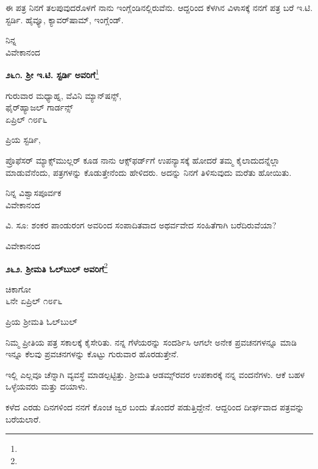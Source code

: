 ಈ ಪತ್ರ ನಿನಗೆ ತಲಪುವುದರೊಳಗೆ ನಾನು ಇಂಗ್ಲೆಂಡಿನಲ್ಲಿರುವೆನು. ಆದ್ದರಿಂದ ಕೆಳಗಿನ ವಿಳಾಸಕ್ಕೆ ನನಗೆ ಪತ್ರ ಬರೆ  ಇ.ಟಿ. ಸ್ಟರ್ಡಿ. ಹೈವ್ಯೂ, ಕ್ಯಾವರ್‌ಷಾಮ್, ಇಂಗ್ಲೆಂಡ್.

{\flushright
ನಿನ್ನ\\ವಿವೇಕಾನಂದ\par}

\begin{center}
\textbf{೨೬೧. ಶ‍್ರೀ ಇ.ಟಿ. ಸ್ಟರ್ಡಿ ಅವರಿಗೆ}\footnote{}
\end{center}

\begin{flushright}
ಗುರುವಾರ ಮಧ್ಯಾಹ್ನ, ವೆವಿನಿ ಮ್ಯಾನ್‌ಷನ್ಸ್,\\ಫೈರ್‌ಹ್ಯಾಜಲ್ ಗಾರ್ಡನ್ಸ್\\ಏಪ್ರಿಲ್ ೧೮೯೬
\end{flushright}

\noindent
ಪ್ರಿಯ ಸ್ಟರ್ಡಿ,

ಪ್ರೊಫೆಸರ್ ಮ್ಯಾಕ್ಸ್‌ಮುಲ್ಲರ್ ಕೂಡ ನಾನು ಆಕ್ಸ್‌ಫರ್ಡ್‌ಗೆ ಉಪನ್ಯಾಸಕ್ಕೆ ಹೋದರೆ ತಮ್ಮ ಕೈಲಾದುದನ್ನೆಲ್ಲಾ ಮಾಡುವೆನೆಂದು, ಪತ್ರಗಳನ್ನು ಕೊಡುತ್ತೇನೆಂದು ಹೇಳಿದರು. ಅದನ್ನು ನಿನಗೆ ತಿಳಿಸುವುದು ಮರೆತು ಹೋಯಿತು.

\begin{flushright}
ನಿನ್ನ ವಿಶ್ವಾಸಪೂರ್ವಕ\\ವಿವೇಕಾನಂದ
\end{flushright}

ವಿ. ಸೂ: ಶಂಕರ ಪಾಂಡುರಂಗ ಅವರಿಂದ ಸಂಪಾದಿತವಾದ ಅಥರ್ವವೇದ ಸಂಹಿತೆಗಾಗಿ ಬರೆದಿರುವೆಯಾ?

{\flushright
ವಿವೇಕಾನಂದ\par}

\eject

\begin{center}
\textbf{೨೬೨. ಶ‍್ರೀಮತಿ ಓಲ್‌ಬುಲ್ ಅವರಿಗೆ}\footnote{}
\end{center}

\begin{flushright}
ಚಿಕಾಗೋ\\೬ನೇ ಏಪ್ರಿಲ್ ೧೮೯೬
\end{flushright}

\noindent
ಪ್ರಿಯ ಶ‍್ರೀಮತಿ ಓಲ್‌ಬುಲ್

ನಿಮ್ಮ ಪ್ರೀತಿಯ ಪತ್ರ ಸಕಾಲಕ್ಕೆ ಕೈಸೇರಿತು. ನನ್ನ ಗೆಳೆಯರನ್ನು ಸಂದರ್ಶಿಸಿ ಆಗಲೇ ಅನೇಕ ಪ್ರವಚನಗಳನ್ನೂ ಮಾಡಿ ಇನ್ನೂ ಕೆಲವು ಪ್ರವಚನಗಳನ್ನು ಕೊಟ್ಟು ಗುರುವಾರ ಹೊರಡುತ್ತೇನೆ.

ಇಲ್ಲಿ ಎಲ್ಲವೂ ಚೆನ್ನಾಗಿ ವ್ಯವಸ್ಥೆ ಮಾಡಲ್ಪಟ್ಟಿತ್ತು. ಶ‍್ರೀಮತಿ ಆಡಮ್ಸ್‌ರವರ ಉಪಕಾರಕ್ಕೆ ನನ್ನ ವಂದನೆಗಳು. ಆಕೆ ಬಹಳ ಒಳ್ಳೆಯವರು ಮತ್ತು ದಯಾಳು.

ಕಳೆದ ಎರಡು ದಿನಗಳಿಂದ ನನಗೆ ಕೊಂಚ ಜ್ವರ ಬಂದು ತೊಂದರೆ ಪಡುತ್ತಿದ್ದೇನೆ. ಆದ್ದರಿಂದ ದೀರ್ಘವಾದ ಪತ್ರವನ್ನು ಬರೆಯಲಾರೆ.

